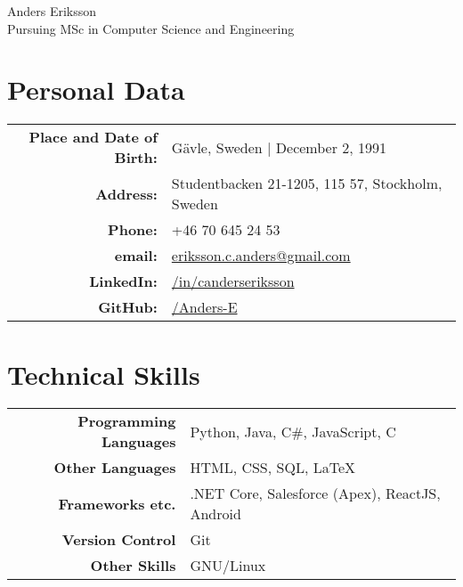 \documentclass[a4paper,10pt]{article}
\begin{document}
\pagestyle{empty} %


\par{
    \centering
	{
	    \Huge \bitter Anders Eriksson \\
	    \normalfont
	    \normalsize Pursuing MSc in Computer Science and Engineering
	}
	\bigskip\par
}

\section{Personal Data}

\begin{tabular}{rl}
    \textbf{Place and Date of Birth:} & Gävle, Sweden  | December 2, 1991 \\
    \textbf{Address:}   & Studentbacken 21-1205, 115 57, Stockholm, Sweden \\
    \textbf{Phone:}     & +46 70 645 24 53\\
    \textbf{email:}     & \href{mailto:eriksson.c.anders@gmail.com
}{eriksson.c.anders@gmail.com}\\
    \textbf{LinkedIn:}	& \href{http://se.linkedin.com/in/canderseriksson}{/in/canderseriksson}\\
    \textbf{GitHub:}	& \href{http://github.com/Anders-E}{/Anders-E}
\end{tabular}

\section{Technical Skills}
\begin{tabular}{r|l}
\textbf{Programming Languages} & Python, Java, C\#, JavaScript, C \\
\textbf{Other Languages} & HTML, CSS, SQL, \LaTeX \\
\textbf{Frameworks etc.} & .NET Core, Salesforce (Apex), ReactJS, Android \\
\textbf{Version Control} & Git \\
\textbf{Other Skills} & GNU/Linux\\
\end{tabular}
\end{document}
